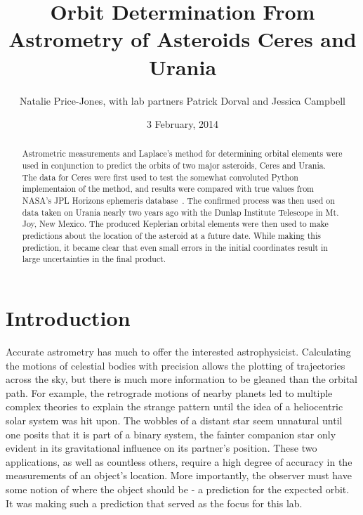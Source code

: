 \documentclass[a4paper,12pt]{article}
\begin{document}
\onehalfspacing
\title{Orbit Determination From Astrometry of Asteroids Ceres and Urania}
\author{Natalie Price-Jones, with lab partners Patrick Dorval and Jessica Campbell}
\date{3 February, 2014}
\maketitle


\begin{abstract}
\label{abstract}

Astrometric measurements and Laplace's method for determining orbital elements were used in conjunction to predict the orbits of two major asteroids, Ceres and Urania. The data for Ceres were first used to test the somewhat convoluted Python implementaion of the method, and results were compared with true values from NASA's JPL Horizons ephemeris database~\citep{urania}. The confirmed process was then used on data taken on Urania nearly two years ago with the Dunlap Institute Telescope in Mt. Joy, New Mexico. The produced Keplerian orbital elements were then used to make predictions about the location of the asteroid at a future date. While making this prediction, it became clear that even small errors in the initial coordinates result in large uncertainties in the final product.

\end{abstract}


\section{Introduction}
\label{sec:intro}

Accurate astrometry has much to offer the interested astrophysicist. Calculating the motions of celestial bodies with precision allows the plotting of trajectories across the sky, but there is much more information to be gleaned than the orbital path. For example, the retrograde motions of nearby planets led to multiple complex theories to explain the strange pattern until the idea of a heliocentric solar system was hit upon. The wobbles of a distant star seem unnatural until one posits that it is part of a binary system, the fainter companion star only evident in its gravitational influence on its partner's position. These two applications, as well as countless others, require a high degree of accuracy in the measurements of an object's location. More importantly, the observer must have some notion of where the object should be - a prediction for the expected orbit. It was making such a prediction that served as the focus for this lab. 
\end{document}
